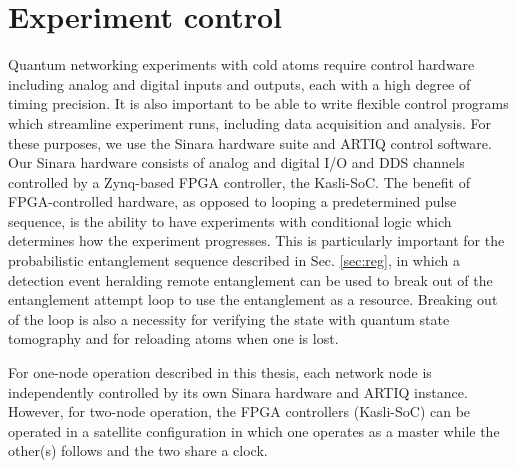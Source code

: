 \section{Experiment control}

Quantum networking experiments with cold atoms require control hardware including analog and digital inputs and outputs, each with a high degree of timing precision. It is also important to be able to write flexible control programs which streamline experiment runs, including data acquisition and analysis. For these purposes, we use the Sinara hardware suite and ARTIQ control software. Our Sinara hardware consists of analog and digital I/O and DDS channels controlled by a Zynq-based FPGA controller, the Kasli-SoC\cite{lam2021combining}. The benefit of FPGA-controlled hardware, as opposed to looping a predetermined pulse sequence, is the ability to have experiments with conditional logic which determines how the experiment progresses. This is particularly important for the probabilistic entanglement sequence described in Sec. \ref{sec:reg}, in which a detection event heralding remote entanglement can be used to break out of the entanglement attempt loop to use the entanglement as a resource. Breaking out of the loop is also a necessity for verifying the state with quantum state tomography and for reloading atoms when one is lost.

For one-node operation described in this thesis, each network node is independently controlled by its own Sinara hardware and ARTIQ instance. However, for two-node operation, the FPGA controllers (Kasli-SoC) can be operated in a satellite configuration in which one operates as a master while the other(s) follows and the two share a clock\cite{Stephenson2020}. 

